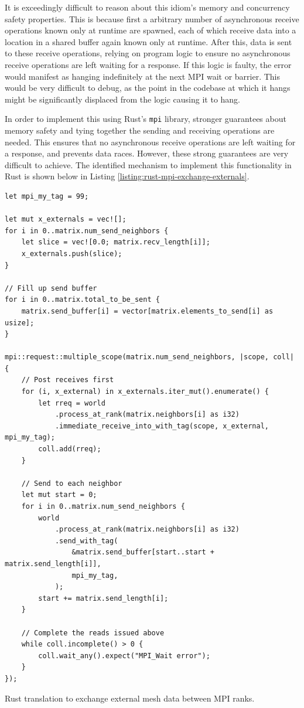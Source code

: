 It is exceedingly difficult to reason about this idiom's memory and concurrency safety properties. This is because first a arbitrary number of asynchronous receive operations known only at runtime are spawned, each of which receive data into a location in a shared buffer again known only at runtime. After this, data is sent to these receive operations, relying on program logic to ensure no asynchronous receive operations are left waiting for a response. If this logic is faulty, the error would manifest as hanging indefinitely at the next MPI wait or barrier. This would be very difficult to debug, as the point in the codebase at which it hangs might be significantly displaced from the logic causing it to hang.

In order to implement this using Rust's \texttt{mpi} library, stronger guarantees about memory safety and tying together the sending and receiving operations are needed. This ensures that no asynchronous receive operations are left waiting for a response, and prevents data races. However, these strong guarantees are very difficult to achieve. The identified mechanism to implement this functionality in Rust is shown below in Listing \ref{listing:rust-mpi-exchange-externals}.

\begin{code}
    \begin{verbatim}
let mpi_my_tag = 99;

let mut x_externals = vec![];
for i in 0..matrix.num_send_neighbors {
    let slice = vec![0.0; matrix.recv_length[i]];
    x_externals.push(slice);
}

// Fill up send buffer
for i in 0..matrix.total_to_be_sent {
    matrix.send_buffer[i] = vector[matrix.elements_to_send[i] as usize];
}

mpi::request::multiple_scope(matrix.num_send_neighbors, |scope, coll| {
    // Post receives first
    for (i, x_external) in x_externals.iter_mut().enumerate() {
        let rreq = world
            .process_at_rank(matrix.neighbors[i] as i32)
            .immediate_receive_into_with_tag(scope, x_external, mpi_my_tag);
        coll.add(rreq);
    }

    // Send to each neighbor
    let mut start = 0;
    for i in 0..matrix.num_send_neighbors {
        world
            .process_at_rank(matrix.neighbors[i] as i32)
            .send_with_tag(
                &matrix.send_buffer[start..start + matrix.send_length[i]],
                mpi_my_tag,
            );
        start += matrix.send_length[i];
    }
    
    // Complete the reads issued above
    while coll.incomplete() > 0 {
        coll.wait_any().expect("MPI_Wait error");
    }
});
    \end{verbatim}
    \caption{Rust translation to exchange external mesh data between MPI ranks.}
    \label{listing:rust-mpi-exchange-externals}
\end{code}

